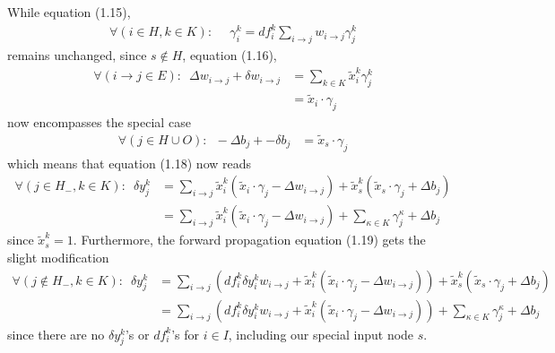 \documentclass[12pt]{article}
\renewcommand{\ij}{i \rightarrow j}
\begin{document}
While equation (1.15),
\begin{align}
\forall (i \in H, k \in K): & \,\,\, \gamma_i^k = df_i^k \sum_{i \rightarrow j} w_{i \rightarrow j} \gamma_j^k
\end{align}
remains unchanged, since $s \not\in H$, equation (1.16),
\begin{align}
\forall (\ij \in E): \,\,\, \Delta w_{\ij} + \delta w_{\ij}
& = \sum_{k \in K} \tilde{x}_i^k \gamma_{j}^k \\
& = \tilde{x}_i \cdot \gamma_j
\end{align}
now encompasses the special case
\begin{align}
\forall (j \in H \cup O): \,\,\, -\Delta b_j + -\delta b_j 
& = \tilde{x}_s \cdot \gamma_j
\end{align}
which means that equation (1.18) now reads
\begin{align}
\forall (j \in H_-, k \in K): \,\,\, \delta y_j^k
& = \sum_{\ij} \tilde{x}_i^k (\tilde{x}_i \cdot \gamma_j - \Delta w_{\ij})
+ \tilde{x}_s^k (\tilde{x}_s \cdot \gamma_j + \Delta b_j) \\
& = \sum_{\ij} \tilde{x}_i^k (\tilde{x}_i \cdot \gamma_j - \Delta w_{\ij})
+ \sum_{\kappa \in K} \gamma_j^\kappa + \Delta b_j
\end{align}
since $\tilde{x}_s^k = 1$.
Furthermore, the forward propagation equation (1.19) gets the slight modification
\begin{align}
\forall (j \not\in H_-, k \in K): \,\,\, \delta y_j^k & = 
\sum_{\ij} (df_i^k \delta y_i^k w_{\ij} + \tilde{x}_i^k (\tilde{x}_i \cdot \gamma_j - \Delta w_{\ij}) ) 
+ \tilde{x}_s^k (\tilde{x}_s \cdot \gamma_j + \Delta b_j) \\
& = \sum_{\ij} (df_i^k \delta y_i^k w_{\ij} + \tilde{x}_i^k (\tilde{x}_i \cdot \gamma_j - \Delta w_{\ij}) ) 
+ \sum_{\kappa \in K} \gamma_j^\kappa + \Delta b_j
\end{align}
since there are no $\delta y_j^k$'s or $df_i^k$'s for $i \in I$, including our special input node $s$.
\end{document}
